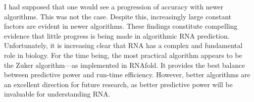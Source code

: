 \documentclass[12pt, a4paper]{article}
\begin{document}
I had supposed that one would see a progression of accuracy with newer algorithms. This was not the case. Despite this, increasingly large constant factors are evident in newer algorithms. These findings constitute compelling evidence that little progress is being made in algorithmic RNA prediction. Unfortunately, it is increasing clear that RNA has a complex and fundamental role in biology. For the time being, the most practical algorithm appears to be the Zuker algorithm---as implemented in RNAfold. It provides the best balance between predictive power and run-time efficiency. However, better algorithms are an excellent direction for future research, as better predictive power will be invaluable for understanding RNA.





\end{document}
